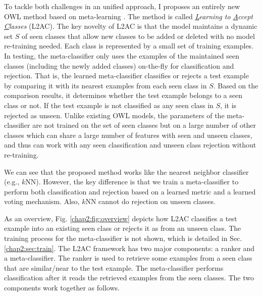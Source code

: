 To tackle both challenges in an unified approach, I proposes an entirely new OWL method based on meta-learning \cite{thrun2012learning,andrychowicz2016learning,fernando2017pathnet,finn2017model,finn2018probabilistic}. The method is called \textit{\underline{L}earning to \underline{A}ccept \underline{C}lasses} (L2AC). The key novelty of L2AC is that the model maintains a dynamic set $S$ of seen classes that allow new classes to be added or deleted with no model re-training needed. Each class is represented by a small set of training examples. In testing, the meta-classifier only uses the examples of the maintained seen classes (including the newly added classes) on-the-fly for classification and rejection. That is, the learned meta-classifier classifies or rejects a test example by comparing it with its nearest examples from each seen class in $S$. Based on the comparison results, it determines whether the test example belongs to a seen class or not. If the test example is not classified as any seen class in $S$, it is rejected as unseen. Unlike existing OWL models, 
the parameters of the meta-classifier are not trained on the set of seen classes but on a large number of other classes which can share a large number of features with seen and unseen classes, and thus can work with any seen classification and unseen class rejection without re-training. 

We can see that the proposed method works like the nearest neighbor classifier (e.g., $k$NN). However, the key difference is that we train a meta-classifier to perform both classification and rejection based on a learned metric and a learned voting mechanism. Also, 
$k$NN cannot do rejection on unseen classes. 

As an overview, Fig. \ref{chap2:fig:overview} depicts how L2AC classifies a test example into an existing seen class or rejects it as from an unseen class. The training process for the meta-classifier is not shown, which is detailed in Sec. \ref{chap2:sec:train}. 
The L2AC framework has two major components: a ranker and a meta-classifier. 
The ranker is used to retrieve some examples from a seen class that are similar/near to the test example. The meta-classifier performs classification after it reads the retrieved examples from the seen classes. The two components work together as follows.

